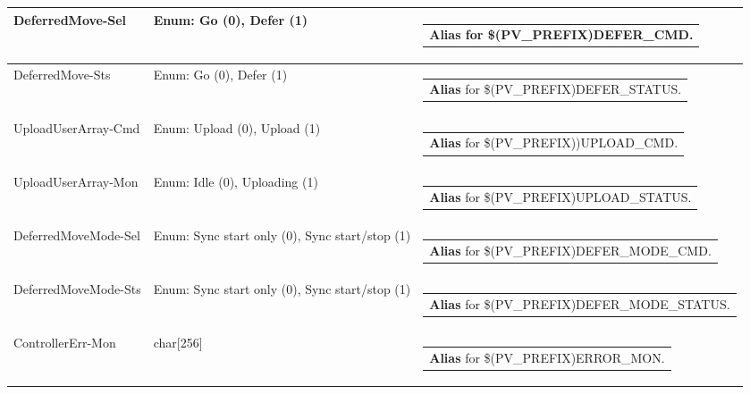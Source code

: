 \documentclass[openany]{article}
\begin{document}
\begin{longtable}{| m{4.5cm} m{2.5cm}  m{8.5cm} |}
        DeferredMove-Sel & Enum: Go (0), Defer (1) & \begin{tabular}{@{}m{6cm}@{}}
                \textbf{\color{blue} Alias} for \$(PV\_PREFIX)DEFER\_CMD.
            \end{tabular} \hypertarget{}{}\\ \hline
        DeferredMove-Sts & Enum: Go (0), Defer (1) & \begin{tabular}{@{}m{6cm}@{}}
                \textbf{\color{blue} Alias} for \$(PV\_PREFIX)DEFER\_STATUS.
            \end{tabular} \hypertarget{pv:upload-user-array-cmd}{}\\ \hline
        UploadUserArray-Cmd & Enum: Upload (0), Upload (1) & \begin{tabular}{@{}m{6cm}@{}}
                \textbf{\color{blue} Alias} for \$(PV\_PREFIX))UPLOAD\_CMD.
            \end{tabular} \hypertarget{pv:upload-user-array-mon}{}\\ \hline
        UploadUserArray-Mon & Enum: Idle (0), Uploading (1) & \begin{tabular}{@{}m{6cm}@{}}
                \textbf{\color{blue} Alias} for \$(PV\_PREFIX)UPLOAD\_STATUS.
            \end{tabular} \hypertarget{pv:deferred-move-mode}{}\\ \hline
        DeferredMoveMode-Sel & Enum: Sync start only (0), Sync start/stop (1) & \begin{tabular}{@{}m{6cm}@{}}
                \textbf{\color{blue} Alias} for \$(PV\_PREFIX)DEFER\_MODE\_CMD.
            \end{tabular} \hypertarget{}{}\\ \hline
        DeferredMoveMode-Sts & Enum: Sync start only (0), Sync start/stop (1) & \begin{tabular}{@{}m{6cm}@{}}
                \textbf{\color{blue} Alias} for \$(PV\_PREFIX)DEFER\_MODE\_STATUS.
            \end{tabular} \hypertarget{pv:controller-err-mon}{}\\ \hline
        ControllerErr-Mon & char[256] & \begin{tabular}{@{}m{6cm}@{}}
                \textbf{\color{blue} Alias} for \$(PV\_PREFIX)ERROR\_MON.
            \end{tabular} \hypertarget{pv:send-cmd}{}\\ \hline

\end{longtable}
\end{document}
